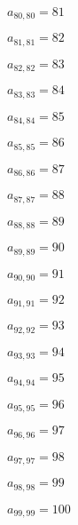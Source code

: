 \documentclass[a4paper,12pt]{article}
\begin{document}
$a _{ 80, 80 } = 81$

$a _{ 81, 81 } = 82$

$a _{ 82, 82 } = 83$

$a _{ 83, 83 } = 84$

$a _{ 84, 84 } = 85$

$a _{ 85, 85 } = 86$

$a _{ 86, 86 } = 87$

$a _{ 87, 87 } = 88$

$a _{ 88, 88 } = 89$

$a _{ 89, 89 } = 90$

$a _{ 90, 90 } = 91$

$a _{ 91, 91 } = 92$

$a _{ 92, 92 } = 93$

$a _{ 93, 93 } = 94$

$a _{ 94, 94 } = 95$

$a _{ 95, 95 } = 96$

$a _{ 96, 96 } = 97$

$a _{ 97, 97 } = 98$

$a _{ 98, 98 } = 99$

$a _{ 99, 99 } = 100$
\end{document}
